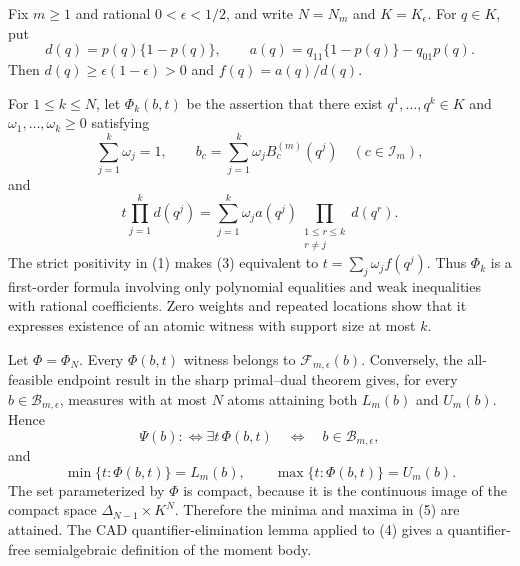 Fix \(m\geq1\) and rational \(0<\epsilon<1/2\), and write \(N=N_m\) and \(K=K_{\epsilon}\).  For \(q\in K\), put
\[
 d(q)=p(q)\{1-p(q)\},\qquad
 a(q)=q_{11}\{1-p(q)\}-q_{01}p(q).
\tag{1}
\]
Then \(d(q)\geq\epsilon(1-\epsilon)>0\) and \(f(q)=a(q)/d(q)\).

For \(1\leq k\leq N\), let \(\Phi_k(b,t)\) be the assertion that there exist \(q^1,\ldots,q^k\in K\) and \(\omega_1,\ldots,\omega_k\geq0\) satisfying
\[
 \sum_{j=1}^k\omega_j=1,\qquad
 b_c=\sum_{j=1}^k\omega_jB_c^{(m)}(q^j)\quad(c\in\mathcal I_m),
\tag{2}
\]
and
\[
 t\prod_{j=1}^kd(q^j)
 =\sum_{j=1}^k\omega_ja(q^j)
   \prod_{\substack{1\leq r\leq k\\r\neq j}}d(q^r).
\tag{3}
\]
The strict positivity in (1) makes (3) equivalent to \(t=\sum_j\omega_jf(q^j)\).  Thus \(\Phi_k\) is a first-order formula involving only polynomial equalities and weak inequalities with rational coefficients.  Zero weights and repeated locations show that it expresses existence of an atomic witness with support size at most \(k\).

Let \(\Phi=\Phi_N\).  Every \(\Phi(b,t)\) witness belongs to \(\mathcal F_{m,\epsilon}(b)\).  Conversely, the all-feasible endpoint result in the sharp primal--dual theorem gives, for every \(b\in\mathcal B_{m,\epsilon}\), measures with at most \(N\) atoms attaining both \(L_m(b)\) and \(U_m(b)\).  Hence
\[
 \Psi(b):\Longleftrightarrow\exists t\,\Phi(b,t)
 \quad\Longleftrightarrow\quad b\in\mathcal B_{m,\epsilon},
\tag{4}
\]
and
\[
 \min\{t:\Phi(b,t)\}=L_m(b),\qquad
 \max\{t:\Phi(b,t)\}=U_m(b).
\tag{5}
\]
The set parameterized by \(\Phi\) is compact, because it is the continuous image of the compact space \(\Delta_{N-1}\times K^N\).  Therefore the minima and maxima in (5) are attained.  The CAD quantifier-elimination lemma applied to (4) gives a quantifier-free semialgebraic definition of the moment body.

